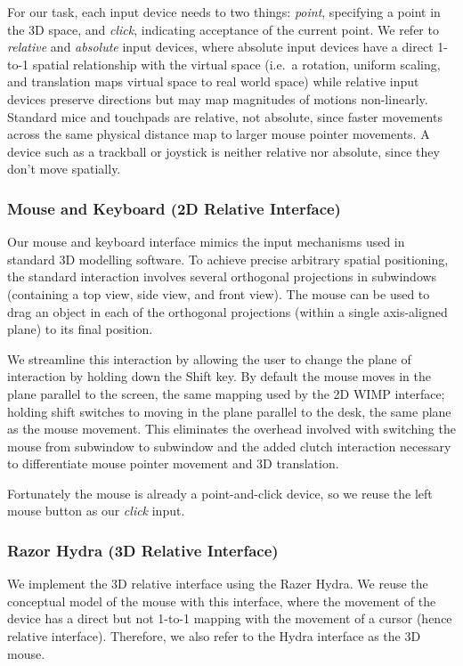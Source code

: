 For our task, each input device needs to two things: {\it point}, specifying a
point in the 3D space, and {\it click}, indicating acceptance of the current
point. We refer to {\it relative} and {\it absolute} input devices, where
absolute input devices have a direct 1-to-1 spatial relationship with the
virtual space (i.e.\ a rotation, uniform scaling, and translation maps virtual
space to real world space) while relative input devices preserve directions
but may map magnitudes of motions non-linearly. Standard mice and touchpads
are relative, not absolute, since faster movements across the same physical
distance map to larger mouse pointer movements. A device such as a trackball
or joystick is neither relative nor absolute, since they don't move spatially.

\subsubsection{Mouse and Keyboard (2D Relative Interface)}
Our mouse and keyboard interface mimics the input mechanisms used in standard
3D modelling software. To achieve precise arbitrary spatial positioning, the
standard interaction involves several orthogonal projections in subwindows
(containing a top view, side view, and front view). The mouse can be used to
drag an object in each of the orthogonal projections (within a single
axis-aligned plane) to its final position.

We streamline this interaction by allowing the user to change the plane of
interaction by holding down the Shift key. By default the mouse moves in the
plane parallel to the screen, the same mapping used by the 2D WIMP interface;
holding shift switches to moving in the plane parallel to the desk, the same
plane as the mouse movement. This eliminates the overhead involved with
switching the mouse from subwindow to subwindow and the added clutch
interaction \cite{bravenuiworld} necessary to differentiate mouse pointer
movement and 3D translation.

Fortunately the mouse is already a point-and-click device, so we reuse the
left mouse button as our {\it click} input.

\subsubsection{Razor Hydra (3D Relative Interface)}
We implement the 3D relative interface using the Razer Hydra. We reuse the
conceptual model of the mouse with this interface, where the movement of the
device has a direct but not 1-to-1 mapping with the movement of a cursor (hence
relative interface). Therefore, we also refer to the Hydra interface as the 3D
mouse.

